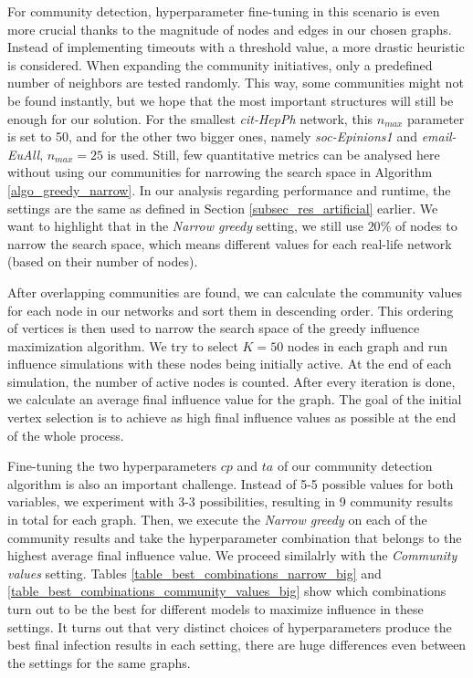 \documentclass[pdflatex,sn-mathphys-ay]{sn-jnl}
\begin{document}
For community detection, hyperparameter fine-tuning in this scenario is even more crucial thanks to the magnitude of nodes and edges in our chosen graphs. Instead of implementing timeouts with a threshold value, a more drastic heuristic is considered. When expanding the community initiatives, only a predefined number of neighbors are tested randomly. This way, some communities might not be found instantly, but we hope that the most important structures will still be enough for our solution. For the smallest \textit{cit-HepPh} network, this $n_{max}$ parameter is set to 50, and for the other two bigger ones, namely \textit{soc-Epinions1} and \textit{email-EuAll}, $n_{max} = 25$ is used. Still, few quantitative metrics can be analysed here without using our communities for narrowing the search space in Algorithm \ref{algo_greedy_narrow}. In our analysis regarding performance and runtime, the settings are the same as defined in Section \ref{subsec_res_artificial} earlier. We want to highlight that in the \textit{Narrow greedy} setting, we still use $20\%$ of nodes to narrow the search space, which means different values for each real-life network (based on their number of nodes).

After overlapping communities are found, we can calculate the community values for each node in our networks and sort them in descending order. This ordering of vertices is then used to narrow the search space of the greedy influence maximization algorithm. We try to select $K = 50$ nodes in each graph and run influence simulations with these nodes being initially active. At the end of each simulation, the number of active nodes is counted. After every iteration is done, we calculate an average final influence value for the graph. The goal of the initial vertex selection is to achieve as high final influence values as possible at the end of the whole process.

Fine-tuning the two hyperparameters $cp$ and $ta$ of our community detection algorithm is also an important challenge. Instead of 5-5 possible values for both variables, we experiment with 3-3 possibilities, resulting in 9 community results in total for each graph. Then, we execute the \textit{Narrow greedy} on each of the community results and take the hyperparameter combination that belongs to the highest average final influence value. We proceed similalrly with the \textit{Community values} setting. Tables \ref{table_best_combinations_narrow_big} and \ref{table_best_combinations_community_values_big} show which combinations turn out to be the best for different models to maximize influence in these settings. It turns out that very distinct choices of hyperparameters produce the best final infection results in each setting, there are huge differences even between the settings for the same graphs.
\end{document}

